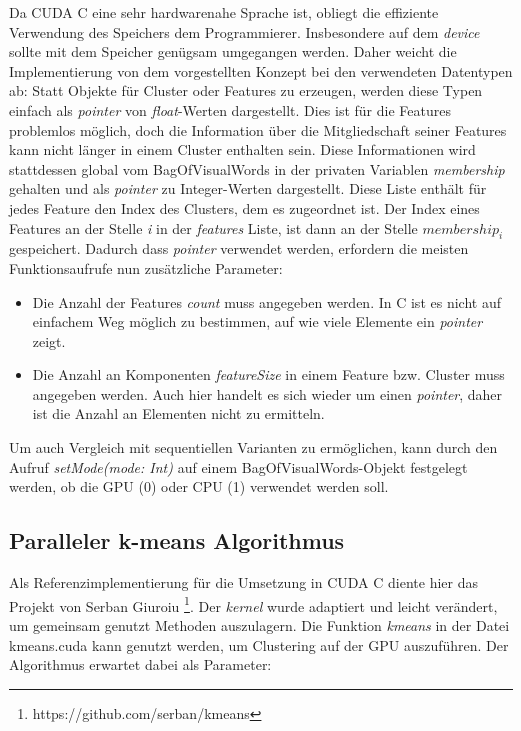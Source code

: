 Da CUDA C eine sehr hardwarenahe Sprache ist, obliegt die effiziente Verwendung des Speichers dem Programmierer. Insbesondere auf dem \textit{device} sollte mit dem Speicher genügsam umgegangen werden. Daher weicht die Implementierung von dem vorgestellten Konzept bei den verwendeten Datentypen ab: Statt Objekte für Cluster oder Features zu erzeugen, werden diese Typen einfach als \textit{pointer} von \textit{float}-Werten dargestellt. Dies ist für die Features problemlos möglich, doch die Information über die Mitgliedschaft seiner Features kann nicht länger in einem Cluster enthalten sein. Diese Informationen wird stattdessen global vom BagOfVisualWords in der privaten Variablen \textit{membership} gehalten und als \textit{pointer} zu Integer-Werten dargestellt. Diese Liste enthält für jedes Feature den Index des Clusters, dem es zugeordnet ist. Der Index eines Features an der Stelle \textit{i} in der \textit{features} Liste, ist dann an der Stelle $membership_i$ gespeichert.\newline
Dadurch dass \textit{pointer} verwendet werden, erfordern die meisten Funktionsaufrufe nun zusätzliche Parameter: 

\begin{itemize}
	\item Die Anzahl der Features \textit{count} muss angegeben werden. In C ist es nicht auf einfachem Weg möglich zu bestimmen, auf wie viele Elemente ein \textit{pointer} zeigt.
	\item Die Anzahl an Komponenten \textit{featureSize} in einem Feature bzw. Cluster muss angegeben werden. Auch hier handelt es sich wieder um einen \textit{pointer}, daher ist die Anzahl an Elementen nicht zu ermitteln.
\end{itemize}

Um auch Vergleich mit sequentiellen Varianten zu ermöglichen, kann durch den Aufruf \textit{setMode(mode: Int)} auf einem BagOfVisualWords-Objekt festgelegt werden, ob die GPU (0) oder CPU (1) verwendet werden soll.

\subsection{Paralleler k-means Algorithmus}

Als Referenzimplementierung für die Umsetzung in CUDA C diente hier das Projekt von Serban Giuroiu \footnote{https://github.com/serban/kmeans}. Der \textit{kernel} wurde adaptiert und leicht verändert, um gemeinsam genutzt Methoden auszulagern. Die Funktion \textit{kmeans} in der Datei kmeans.cuda kann genutzt werden, um Clustering auf der GPU auszuführen. Der Algorithmus erwartet dabei als Parameter:

